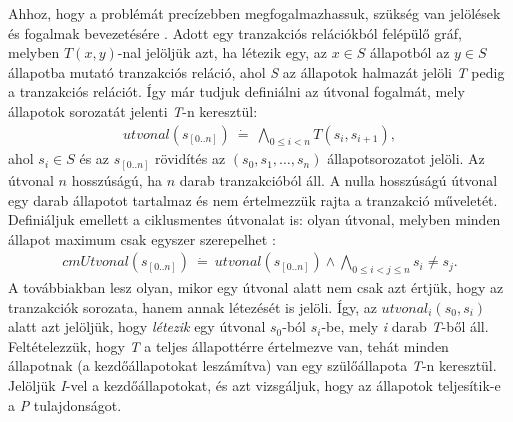 Ahhoz, hogy a problémát precízebben megfogalmazhassuk, szükség van jelölések és fogalmak bevezetésére \cite{k_induction_article}. Adott egy tranzakciós relációkból felépülő gráf, melyben $T(x, y)$-nal jelöljük azt, ha létezik egy, az $x \in S$ állapotból az $y \in S$ állapotba mutató tranzakciós reláció, ahol \emph{S} az állapotok halmazát jelöli \textit{T} pedig a tranzakciós relációt. Így már tudjuk definiálni az útvonal fogalmát, mely állapotok sorozatát jelenti \emph{T}-n keresztül:
\begin{align}
	\label{eq:relacio_sor}
	\mathit{utvonal}(s_{[0..n]})~\dot{=}~\bigwedge_{0 \leq i < n} T(s_{i}, s_{i+1}),
\end{align}
ahol $s_i \in S$ és az $s_{[0..n]}$ rövidítés az $(s_{0}, s_{1}, \dots, s_{n})$ állapotsorozatot jelöli. Az útvonal $n$ hosszúságú, ha $n$ darab tranzakcióból áll. A nulla hosszúságú útvonal egy darab állapotot tartalmaz és nem értelmezzük rajta a tranzakció műveletét.
\newline
\newline
Definiáljuk emellett a ciklusmentes útvonalat is: olyan útvonal, melyben minden állapot maximum csak egyszer szerepelhet \cite{korl_mod_majz}:
\begin{align}
	\mathit{cmUtvonal}(s_{[0..n]})~\dot{=}~\mathit{utvonal}(s_{[0..n]}) \wedge \bigwedge_{0 \leq i < j \leq n} s_{i} \neq s_{j}.
\end{align}
A továbbiakban lesz olyan, mikor egy útvonal alatt nem csak azt értjük, hogy az tranzakciók sorozata, hanem annak létezését is jelöli. Így, az $\mathit{utvonal}_{i}(s_{0}, s_{i})$ alatt azt jelöljük, hogy \emph{létezik} egy útvonal $s_{0}$-ból $s_{i}$-be, mely \emph{i} darab \emph{T}-ből áll.
\newline
\newline
Feltételezzük, hogy \emph{T} a teljes állapottérre értelmezve van, tehát minden állapotnak (a kezdőállapotokat leszámítva) van egy szülőállapota \emph{T}-n keresztül. Jelöljük \emph{I}-vel a kezdőállapotokat, és azt vizsgáljuk, hogy az állapotok teljesítik-e a \emph{P} tulajdonságot.

